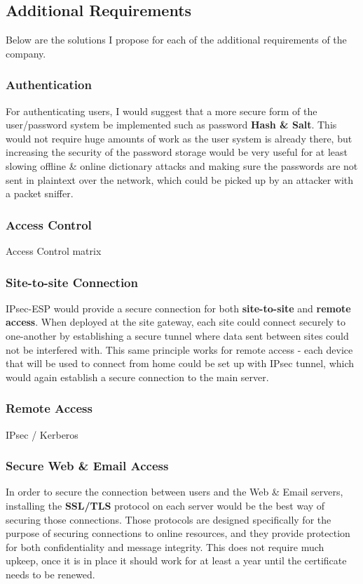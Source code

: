 \documentclass[11pt]{article}
\begin{document}
      \subsection{Additional Requirements}
        Below are the solutions I propose for each of the additional requirements of the company.

        \subsubsection{Authentication}
          For authenticating users, I would suggest that a more secure form of the user/password system be implemented such as password \textbf{Hash \& Salt}. This would not require huge amounts of work as the user system is already there, but increasing the security of the password storage would be very useful for at least slowing offline \& online dictionary attacks and making sure the passwords are not sent in plaintext over the network, which could be picked up by an attacker with a packet sniffer.

        \subsubsection{Access Control}
          Access Control matrix

        \subsubsection{Site-to-site Connection}
          IPsec-ESP would provide a secure connection for both \textbf{site-to-site} and \textbf{remote access}. When deployed at the site gateway, each site could connect securely to one-another by establishing a secure tunnel where data sent between sites could not be interfered with. This same principle works for remote access - each device that will be used to connect from home could be set up with IPsec tunnel, which would again establish a secure connection to the main server.

        \subsubsection{Remote Access}
          IPsec / Kerberos

        \subsubsection{Secure Web \& Email Access}
          In order to secure the connection between users and the Web \& Email servers, installing the \textbf{SSL/TLS} protocol on each server would be the best way of securing those connections. Those protocols are designed specifically for the purpose of securing connections to online resources, and they provide protection for both confidentiality and message integrity. This does not require much upkeep, once it is in place it should work for at least a year until the certificate needs to be renewed.
\end{document}
